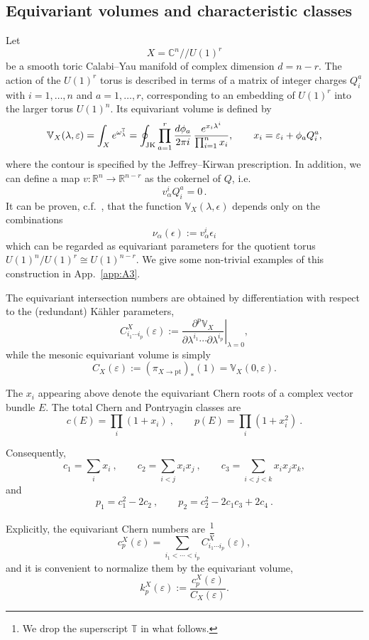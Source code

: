 \documentclass[11pt,a4paper]{article}
\theoremstyle{definition}
\theoremstyle{identity}
\theoremstyle{remark}
\newcommand{\be}{\begin{equation}}
\newcommand{\ee}{\end{equation}}
\newcommand{\e}{\epsilon}
\newcommand{\lam}{\lambda}
\newcommand{\BV}{\mathbb{V}}
\newcommand{\BT}{\mathbb{T}}
\newcommand{\BC}{\mathbb{C}}
\newcommand{\BR}{\mathbb{R}}
\begin{document}
\subsection{Equivariant volumes and characteristic classes}

Let
\[
X=\BC^n/\!\!/U(1)^r
\]
be a smooth toric Calabi--Yau manifold of complex dimension
$d=n-r$. The action of the $U(1)^r$ torus is described in terms of a matrix of integer charges $Q_i^a$ with $i=1,\dots,n$ and $a=1,\dots,r$, corresponding to an embedding of $U(1)^r$ into the larger torus $U(1)^n$.
Its equivariant volume is defined by
\be
\label{eq:AV}
\BV_X(\lambda,\varepsilon)
=
\int_X e^{\omega^{\BT}_\lambda}
=
\oint_{\rm JK}
\prod_{a=1}^{r}
\frac{d\phi_a}{2\pi i}
\,
\frac{e^{x_i\lambda^i}}
{\prod_{i=1}^{n}x_i},
\qquad
x_i=\varepsilon_i+\phi_aQ_i^a,
\ee
where the contour is specified by the Jeffrey--Kirwan prescription. In addition, we can define a map $v:\BR^n\to\BR^{n-r}$ as the cokernel of $Q$, i.e.\
\be
\label{eq:map-v}
 v^i_\alpha Q_i^a = 0\,.
\ee
It can be proven, c.f.\ \cite{Cassia:2025aus}, that the function $\BV_X(\lam,\e)$ depends only on the combinations
\be
\label{eq:nuinsteadofeps}
 \nu_\alpha(\e) := v^i_\alpha\e_i
\ee
which can be regarded as equivariant parameters for the quotient torus $U(1)^n/U(1)^r\cong U(1)^{n-r}$. We give some non-trivial examples of this construction in App.\ \ref{app:A3}.

The equivariant intersection numbers are obtained by differentiation with respect to the
(redundant) K\"ahler parameters,
\be
C^X_{i_1\cdots i_p}(\varepsilon)
:=
\left.
\frac{\partial^p\BV_X}
{\partial\lambda^{i_1}\cdots\partial\lambda^{i_p}}
\right|_{\lambda=0},
\ee
while the mesonic equivariant volume is simply
\be
C_X(\varepsilon)
:= (\pi_{X \to \text{pt}})_* (1) =
\BV_X(0,\varepsilon).
\ee

The
$x_i$ appearing above
denote the equivariant Chern roots of a complex vector bundle $E$.
The total Chern and Pontryagin classes are
\be
c(E)
=
\prod_i(1+x_i)\ ,
\qquad
p(E)
=
\prod_i(1+x_i^2)\ .
\ee

Consequently,
\be
c_1=\sum_i x_i\ ,\qquad
c_2=\sum_{i<j}x_ix_j\ , \qquad
c_3=\sum_{i<j<k}x_ix_jx_k,
\ee
and
\be
p_1=c_1^2-2c_2\ , \qquad
p_2=c_2^2-2c_1c_3+2c_4\ .
\ee

Explicitly, the equivariant Chern numbers are~\footnote{We drop the superscript $\BT$ in what follows.}
\be
c_p^X(\varepsilon)
=
\sum_{i_1<\cdots<i_p}
C^X_{i_1\cdots i_p}(\varepsilon),
\ee
and it is convenient to normalize them by the equivariant volume,
\be\label{eq:kpX}
k_p^X(\varepsilon)
:=
\frac{c_p^X(\varepsilon)}
{C_X(\varepsilon)}.
\ee
\end{document}
